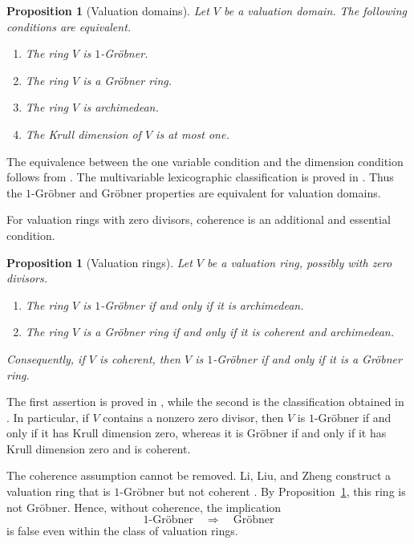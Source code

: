 \documentclass[preprint,12pt,3p]{elsarticle}
\newtheorem{proposition}[theorem]{Proposition}
\theoremstyle{definition}
\theoremstyle{remark}
\begin{document}
	\begin{proposition}[Valuation domains]
		\label{prop:valuation-domain-grobner}
		Let $V$ be a valuation domain. The following conditions are
		equivalent.
		\begin{enumerate}
			\item The ring $V$ is $1$-Gr\"obner.
			\item The ring $V$ is a Gr\"obner ring.
			\item The ring $V$ is archimedean.
			\item The Krull dimension of $V$ is at most one.
		\end{enumerate}
	\end{proposition}
	
	The equivalence between the one variable condition and the dimension
	condition follows from
	\cite{LombardiSchusterYengui2012}. The multivariable lexicographic
	classification is proved in \cite{Yengui2014Lex}. Thus the
	$1$-Gr\"obner and Gr\"obner properties are equivalent for valuation
	domains.
	
	For valuation rings with zero divisors, coherence is an additional
	and essential condition.
	
	\begin{proposition}[Valuation rings]
		\label{prop:valuation-ring-grobner}
		Let $V$ be a valuation ring, possibly with zero divisors.
		\begin{enumerate}
			\item The ring $V$ is $1$-Gr\"obner if and only if it is
			archimedean.
			\item The ring $V$ is a Gr\"obner ring if and only if it is
			coherent and archimedean.
		\end{enumerate}
		Consequently, if $V$ is coherent, then $V$ is $1$-Gr\"obner if
		and only if it is a Gr\"obner ring.
	\end{proposition}
	
	The first assertion is proved in \cite{LiLiuZheng2017}, while the
	second is the classification obtained in
	\cite{PolaYengui2014}. In particular, if $V$ contains a nonzero zero
	divisor, then $V$ is $1$-Gr\"obner if and only if it has Krull
	dimension zero, whereas it is Gr\"obner if and only if it has Krull
	dimension zero and is coherent.
	
	The coherence assumption cannot be removed. Li, Liu, and Zheng
	construct a valuation ring that is $1$-Gr\"obner but not coherent
	\cite{LiLiuZheng2017}. By
	Proposition~\ref{prop:valuation-ring-grobner}, this ring is not
	Gr\"obner. Hence, without coherence, the implication
	\[
	1\text{-Gr\"obner}
	\quad\Longrightarrow\quad
	\text{Gr\"obner}
	\]
	is false even within the class of valuation rings.
\end{document}

